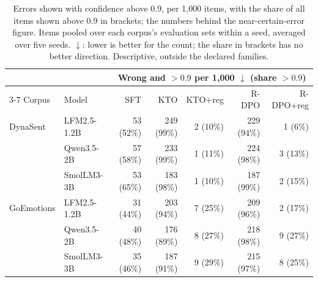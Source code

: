 \begin{table}[t]
\centering
\caption{Errors shown with confidence above 0.9, per 1{,}000 items, with the share of all items shown above 0.9 in brackets; the numbers behind the near-certain-error figure. Items pooled over each corpus's evaluation sets within a seed, averaged over five seeds. $\downarrow$: lower is better for the count; the share in brackets has no better direction. Descriptive, outside the declared families.}
\label{tab:near-certain}
\footnotesize
\setlength{\tabcolsep}{4pt}
\begin{tabular}{llrrrrr}
\toprule
& & \multicolumn{5}{c}{Wrong and $>0.9$ per 1{,}000 $\downarrow$ (share $>0.9$)} \\ \cmidrule(lr){3-7}
Corpus & Model & SFT & KTO & KTO+reg & R-DPO & R-DPO+reg \\
\midrule
DynaSent & LFM2.5-1.2B & 53 (52\%) & 249 (99\%) & 2 (10\%) & 229 (94\%) & 1 (6\%) \\
 & Qwen3.5-2B & 57 (58\%) & 233 (99\%) & 1 (11\%) & 224 (98\%) & 3 (13\%) \\
 & SmolLM3-3B & 53 (65\%) & 183 (98\%) & 1 (10\%) & 187 (99\%) & 2 (15\%) \\
\addlinespace
GoEmotions & LFM2.5-1.2B & 31 (44\%) & 203 (94\%) & 7 (25\%) & 209 (96\%) & 2 (17\%) \\
 & Qwen3.5-2B & 40 (48\%) & 176 (89\%) & 8 (27\%) & 218 (98\%) & 9 (27\%) \\
 & SmolLM3-3B & 35 (46\%) & 187 (91\%) & 9 (29\%) & 215 (97\%) & 8 (25\%) \\
\bottomrule
\end{tabular}
\end{table}
